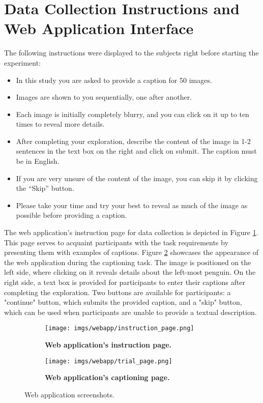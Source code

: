 \documentclass{article}
\begin{document}
 

\newpage
\appendix
\section{Data Collection Instructions and Web Application Interface}

The following instructions were displayed to the subjects right before starting the experiment:

\begin{itemize}
    \item In this study you are asked to provide a caption for 50 images.
    \item Images are shown to you sequentially, one after another.
    \item Each image is initially completely blurry, and you can click on it up to ten times to reveal more details.
    \item After completing your exploration, describe the content of the image in 1-2 sentences in the text box on the right and click on submit. The caption must be in English.
    \item If you are very unsure of the content of the image, you can skip it by clicking the “Skip” button.
    \item Please take your time and try your best to reveal as much of the image as possible before providing a caption.
\end{itemize}

The web application's instruction page for data collection is depicted in Figure \ref{fig:webapp_instructions}. This page serves to acquaint participants with the task requirements by presenting them with examples of captions. Figure \ref{fig:webapp_captioning} showcases the appearance of the web application during the captioning task. The image is positioned on the left side, where clicking on it reveals details about the left-most penguin. On the right side, a text box is provided for participants to enter their captions after completing the exploration. Two buttons are available for participants: a "continue" button, which submits the provided caption, and a "skip" button, which can be used when participants are unable to provide a textual description.


\begin{figure}[htbp]
  \begin{subfigure}[t]{0.45\textwidth}
    \centering
    \texttt{[image: imgs/webapp/instruction\_page.png]}
    \caption{\textbf{Web application's instruction page.}}
    \label{fig:webapp_instructions}
  \end{subfigure}
  \hfill
  \begin{subfigure}[t]{0.45\textwidth}
    \centering
    \texttt{[image: imgs/webapp/trial\_page.png]}
    \caption{\textbf{Web application's captioning page.}}
    \label{fig:webapp_captioning}
  \end{subfigure}
  \caption{Web application screenshots.}
  \label{fig:webapp_screenshots}
\end{figure}
\end{document}
